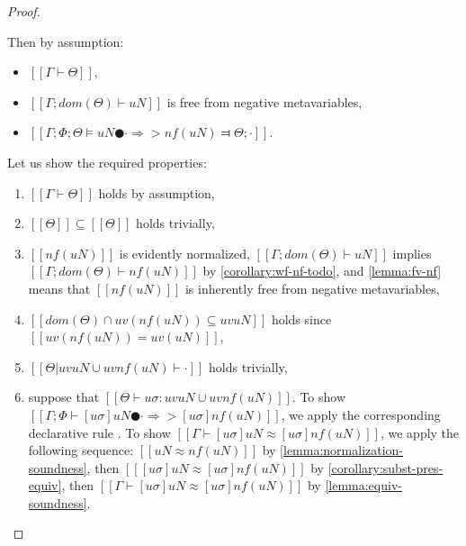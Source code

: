 \begin{proof}
\begin{caseof}
        \item {}
            Then by assumption:
            \begin{itemize}
                \item $[[Γ ⊢ Θ]]$,
                \item $[[Γ; dom(Θ) ⊢  uN]]$ is free from negative metavariables,
                \item $[[Γ; Φ; Θ ⊨ uN ● · ⇒> nf(uN) ⫤ Θ; ·]]$.
            \end{itemize}

            Let us show the required properties: 
            \begin{enumerate}
                \item $[[Γ ⊢ Θ]]$ holds by assumption,
                \item $[[Θ]] \subseteq [[Θ]]$ holds trivially,
                \item $[[nf(uN)]]$ is evidently normalized, 
                    $[[Γ; dom(Θ) ⊢  uN]]$ implies $[[Γ; dom(Θ) ⊢  nf(uN)]]$ by 
                    \cref{corollary:wf-nf-todo},
                    and \cref{lemma:fv-nf} means that $[[nf(uN)]]$ is 
                    inherently free from negative metavariables,
                \item $[[dom(Θ) ∩ uv(nf(uN)) ⊆ uv uN]]$
                    holds since $[[uv(nf(uN)) = uv(uN)]]$,
                \item $[[Θ|uv uN ∪ uv nf(uN) ⊢ ·]]$ holds trivially,
                \item suppose that $[[ Θ ⊢ uσ : uv uN ∪ uv nf(uN) ]]$.
                    To show $[[ Γ ; Φ ⊢ [uσ]uN ● · ⇒> [uσ]nf(uN) ]]$, we apply the corresponding 
                    declarative rule .
                    To show $[[ Γ ⊢ [uσ]uN ≈ [uσ]nf(uN) ]]$,
                    we apply the following sequence:
                    $[[uN ≈ nf(uN)]]$ by 
                    \cref{lemma:normalization-soundness},
                    then $[[ [uσ]uN ≈ [uσ]nf(uN) ]]$
                    by \cref{corollary:subst-pres-equiv},
                    then $[[ Γ ⊢ [uσ]uN ≈ [uσ]nf(uN) ]]$
                    by \cref{lemma:equiv-soundness}. 
            \end{enumerate}


\end{caseof}
\end{proof}
